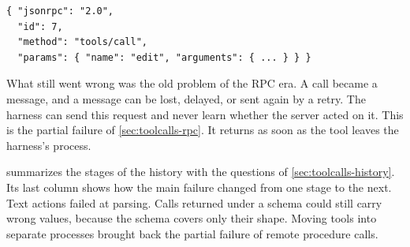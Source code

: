 \begin{lstlisting}[basicstyle=\ttfamily\footnotesize, caption={An illustrative MCP request that calls the tool \texttt{edit}, abbreviated.}, label=lst:toolcalls-mcp]
{ "jsonrpc": "2.0",
  "id": 7,
  "method": "tools/call",
  "params": { "name": "edit", "arguments": { ... } } }
\end{lstlisting}

What still went wrong was the old problem of the RPC era. A call became a message, and a message can
be lost, delayed, or sent again by a retry. The harness can send this request and never learn
whether the server acted on it. This is the partial failure of \cref{sec:toolcalls-rpc}. It returns
as soon as the tool leaves the harness's process.

 summarizes the stages of the history with the questions of
\cref{sec:toolcalls-history}. Its last column shows how the main failure changed from one stage to
the next. Text actions failed at parsing. Calls returned under a schema could still carry wrong
values, because the schema covers only their shape. Moving tools into separate processes brought
back the partial failure of remote procedure calls.

